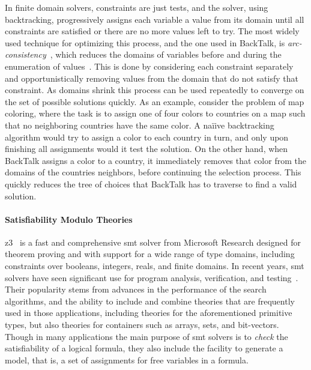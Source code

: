 In finite domain solvers, constraints are just tests, and the solver,
using backtracking, progressively assigns each variable a value from
its domain until all constraints are satisfied or there are no more
values left to try. The most widely used technique for optimizing this
process, and the one used in BackTalk, is \emph{arc-consistency}~\cite{waltz1972generating}, which reduces the domains of variables
before and during the enumeration of values~\cite{nadel1988tree,prosser1993hybrid}. This is done by considering
each constraint separately and opportunistically removing values from
the domain that do not satisfy that constraint. As domains shrink this
process can be used repeatedly to converge on the set of possible
solutions quickly. As an example, consider the problem of map
coloring, where the task is to assign one of four colors to countries
on a map such that no neighboring countries have the same color. A
na{\"i}ive backtracking algorithm would try to assign a color to each
country in turn, and only upon finishing all assignments would it test
the solution. On the other hand, when BackTalk assigns a color to a
country, it immediately removes that color from the domains of the
countries neighbors, before continuing the selection process. This
quickly reduces the tree of choices that BackTalk has to traverse to
find a valid solution.

\paragraph{Satisfiability Modulo Theories}
\label{sec:z3}
\gls{z3}~\cite{de2008z3} is a fast and comprehensive \gls{smt} solver
from Microsoft Research designed for theorem proving and with support
for a wide range of type domains, including constraints over booleans,
integers, reals, and finite domains. In recent years, \gls{smt}
solvers have seen significant use for program analysis, verification,
and testing~\cite{bjornernuz}. Their popularity stems from advances in
the performance of the search algorithms, and the ability to include
and combine theories that are frequently used in those applications,
including theories for the aforementioned primitive types, but also
theories for containers such as arrays, sets, and bit-vectors. Though
in many applications the main purpose of \gls{smt} solvers is to
\emph{check} the satisfiability of a logical formula, they also
include the facility to generate a model, that is, a set of
assignments for free variables in a formula.

